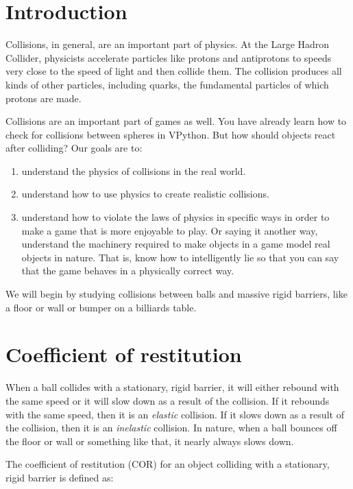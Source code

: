 
\section*{Introduction}

Collisions, in general, are an important part of physics. At the Large Hadron Collider, physicists accelerate particles like protons and antiprotons to speeds very close to the speed of light and then collide them. The collision produces all kinds of other particles, including quarks, the fundamental particles of which protons are made.

Collisions are an important part of games as well. You have already learn how to check for collisions between spheres in VPython. But how should objects react after colliding?  Our goals are to:

\begin{enumerate}
	\item understand the physics of collisions in the real world.
	\item understand how to use physics to create realistic collisions.
	\item understand how to violate the laws of physics in specific ways in order to make a game that is more enjoyable to play. Or saying it another way, understand the machinery required to make objects in a game model real objects in nature. That is, know how to intelligently lie so that you can say that the game behaves in a physically correct way.
\end{enumerate}

We will begin by studying collisions between balls and massive rigid barriers, like a floor or wall or bumper on a billiards table.

\section*{Coefficient of restitution}

When a ball collides with a stationary, rigid barrier, it will either rebound with the same speed or it will slow down as a result of the collision. If it rebounds with the same speed, then it is an \emph{elastic} collision. If it slows down as a result of the collision, then it is an \emph{inelastic} collision. In nature, when a ball bounces off the floor or wall or something like that, it nearly always slows down. 

The coefficient of restitution (COR) for an object colliding with a stationary, rigid barrier is defined as:

